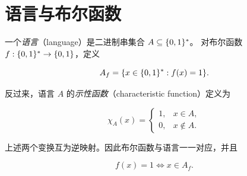 \section{语言与布尔函数}

\begin{definition}[语言与示性函数]
  \label{def:language-characteristic-function}
  一个\emph{语言}（language）是二进制串集合 $A\subseteq\{0,1\}^{*}$。
  对布尔函数 $f:\{0,1\}^{*}\to\{0,1\}$，定义

  \[
    A_f=\{x\in\{0,1\}^{*}:f(x)=1\}.
  \]

  反过来，语言 $A$ 的\emph{示性函数}（characteristic function）定义为

  \[
    \chi_A(x)=
    \begin{cases}
      1, & x\in A,\\
      0, & x\notin A.
    \end{cases}
  \]
\end{definition}

上述两个变换互为逆映射。因此布尔函数与语言一一对应，并且

\[
  f(x)=1\iff x\in A_f.
\]
